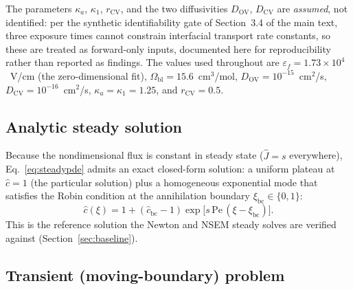 The parameters $\kappa_a$, $\kappa_1$, $r_\text{CV}$, and the two
diffusivities $D_\text{OV}$, $D_\text{CV}$ are \emph{assumed}, not
identified: per the synthetic identifiability gate of Section~3.4 of the main text, three exposure times cannot constrain interfacial transport
rate constants, so these are treated as forward-only inputs, documented
here for reproducibility rather than reported as findings. The values
used throughout are $\varepsilon_f = 1.73\times10^4$~V/cm (the
zero-dimensional fit), $\Omega_\mathrm{bl} = 15.6$~cm$^3$/mol,
$D_\text{OV} = 10^{-15}$~cm$^2$/s, $D_\text{CV} = 10^{-16}$~cm$^2$/s,
$\kappa_a = \kappa_1 = 1.25$, and $r_\text{CV} = 0.5$.

\subsection{Analytic steady solution}

Because the nondimensional flux is constant in steady state
($\hat{J} = s$ everywhere), Eq.~\eqref{eq:steadypde} admits an exact
closed-form solution: a uniform plateau at $\hat{c} = 1$ (the particular
solution) plus a homogeneous exponential mode that satisfies the Robin
condition at the annihilation boundary $\xi_\text{bc} \in \{0, 1\}$:
\begin{equation}
\hat{c}(\xi) = 1 + \left(\hat{c}_\text{bc} - 1\right)
\exp\!\big[s\,\mathrm{Pe}\,(\xi - \xi_\text{bc})\big].
\label{eq:steadyanalytic}
\end{equation}
This is the reference solution the Newton and NSEM steady solves are
verified against (Section~\ref{sec:baseline}).

\subsection{Transient (moving-boundary) problem}

